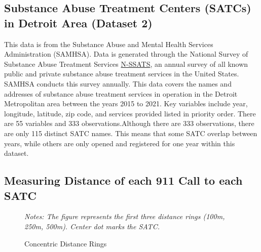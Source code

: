 \documentclass[12pt]{article}
\begin{document}
\subsection{Substance Abuse Treatment Centers (SATCs) in Detroit Area (Dataset 2)}

This data is from the Substance Abuse and Mental Health Services Administration (SAMHSA). Data is generated through the National Survey of Substance Abuse Treatment Services \href{https://www.samhsa.gov/data/data-we-collect/n-ssats-national-survey-substance-abuse-treatment-services}{N-SSATS}, an annual survey of all known public and private substance abuse treatment services in the United States. SAMHSA conducts this survey annually.  This data covers the names and addresses of substance abuse treatment services in operation in the Detroit Metropolitan area between the years 2015 to 2021. Key variables include year, longitude, latitude, zip code, and services provided listed in priority order. There are 55 variables and 333 observations.\footnotemark[1]Although there are 333 observations, there are only 115 distinct SATC names. This means that some SATC overlap between years, while others are only opened and registered for one year within this dataset. 



\subsection{Measuring Distance of each 911 Call to each SATC}
 


\begin{figure} 
\caption{Concentric Distance Rings}
\small\textit{Notes: The figure represents the first three distance rings (100m, 250m, 500m). Center dot marks the SATC.}
\end{figure}
\end{document}
